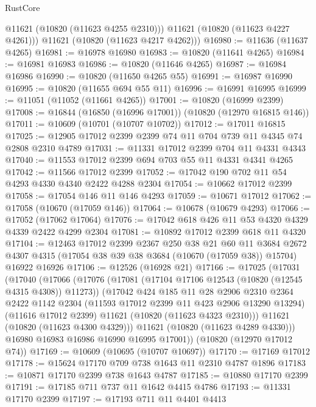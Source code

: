\begin{lexlean}{RustCore}
\begin{coremodule}
          @11621
          (@10820 (@11623 @4255 @2310)))
        @11621
        (@10820 (@11623 @4227 @4261)))
      @11621
      (@10820 (@11623 @4217 @4262)))
@16980 := @11636 (@11637 @4265)
@16981 := @16978 @16980
@16983 := @10820 (@11641 @4265)
@16984 := @16981 @16983
@16986 := @10820 (@11646 @4265)
@16987 := @16984 @16986
@16990 := @10820 (@11650 @4265 @55)
@16991 := @16987 @16990
@16995 := @10820 (@11655 @694 @55 @11)
@16996 := @16991 @16995
@16999 := @11051 (@11052 (@11661 @4265))
@17001 := @10820 (@16999 @2399)
@17008 := @16844 (@16850 (@16996 @17001)) (@10820 (@12970 @16815 @146))
@17011 := @10609 (@10701 (@10707 @10702))
@17012 := @17011 @16815
@17025 := @12905 @17012 @2399 @2399 @74 @11 @704 @739 @11 @4345 @74 @2808 @2310 @4789
@17031 := @11331 @17012 @2399 @704 @11 @4331 @4343
@17040 := @11553 @17012 @2399 @694 @703 @55 @11 @4331 @4341 @4265
@17042 := @11566 @17012 @2399
@17052 := @17042 @190 @702 @11 @54 @4293 @4330 @4340 @2422 @4288 @2304
@17054 := @10662 @17012 @2399
@17058 := @17054 @146 @11 @146 @4293
@17059 := @10671 @17012
@17062 := @17058 (@10670 (@17059 @146))
@17064 := @10678 (@10679 @4293)
@17066 := @17052 (@17062 @17064)
@17076 := @17042 @618 @426 @11 @53 @4320 @4329 @4339 @2422 @4299 @2304
@17081 := @10892 @17012 @2399 @618 @11 @4320
@17104 := @12463
    @17012
    @2399
    @2367
    @250
    @38
    @21
    @60
    @11
    @3684
    @2672
    @4307
    @4315
    (@17054 @38 @39 @38 @3684 (@10670 (@17059 @38)) @15704)
    @16922
    @16926
@17106 := @12526 (@16928 @21)
@17166 := @17025
    (@17031
      (@17040
        (@17066
          (@17076
            (@17081 (@17104 @17106 @12543 (@10820 (@12545 @4315 @4308)) @11273))
            (@17042
              @424
              @185
              @11
              @28
              @2906
              @2310
              @2364
              @2422
              @1142
              @2304
              (@11593 @17012 @2399 @11 @423 @2906 @13290 @13294)
              (@11616 @17012 @2399)
              @11621
              (@10820 (@11623 @4323 @2310)))
            @11621
            (@10820 (@11623 @4300 @4329)))
          @11621
          (@10820 (@11623 @4289 @4330)))
        @16980
        @16983
        @16986
        @16990
        @16995
        @17001))
    (@10820 (@12970 @17012 @74))
@17169 := @10609 (@10695 (@10707 @10697))
@17170 := @17169 @17012
@17178 := @15624 @17170 @709 @738 @1643 @11 @2310 @4787 @1896
@17183 := @10871 @17170 @2399 @738 @1643 @4787
@17185 := @10880 @17170 @2399
@17191 := @17185 @711 @737 @11 @1642 @4415 @4786
@17193 := @11331 @17170 @2399
@17197 := @17193 @711 @11 @4401 @4413

\end{coremodule}
\end{lexlean}
